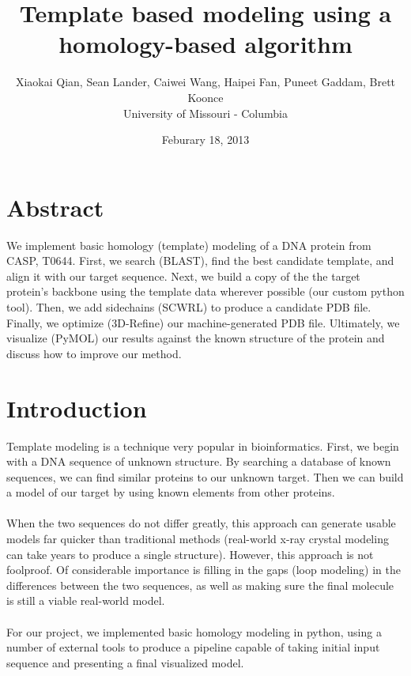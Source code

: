 \documentclass{article}
\title{Template based modeling using a homology-based algorithm}
\author{Xiaokai Qian, Sean Lander, Caiwei Wang, Haipei Fan, Puneet Gaddam, Brett Koonce\\University of Missouri - Columbia}
\date{Feburary 18, 2013}
\begin{document}
\maketitle

\section{Abstract}
We implement basic homology (template) modeling of a DNA protein from CASP, T0644.  First, we search (BLAST), find the best candidate template, and align it with our target sequence.  Next, we build a copy of the the target protein's backbone using the template data wherever possible (our custom python tool).  Then, we add sidechains (SCWRL) to produce a candidate PDB file.  Finally, we optimize (3D-Refine) our machine-generated PDB file.  Ultimately, we visualize (PyMOL) our results against the known structure of the protein and discuss how to improve our method.

\section{Introduction}

Template modeling is a technique very popular in bioinformatics.  First, we begin with a DNA sequence of unknown structure.  By searching a database of known sequences, we can find similar proteins to our unknown target.  Then we can build a model of our target by using known elements from other proteins.\\\\
When the two sequences do not differ greatly, this approach can generate usable models far quicker than traditional methods (real-world x-ray crystal modeling can take years to produce a single structure).  However, this approach is not foolproof.  Of considerable importance is filling in the gaps (loop modeling) in the differences between the two sequences, as well as making sure the final molecule is still a viable real-world model.\\\\
For our project, we implemented basic homology modeling in python, using a number of external tools to produce a pipeline capable of taking initial input sequence and presenting a final visualized model.
\end{document}
